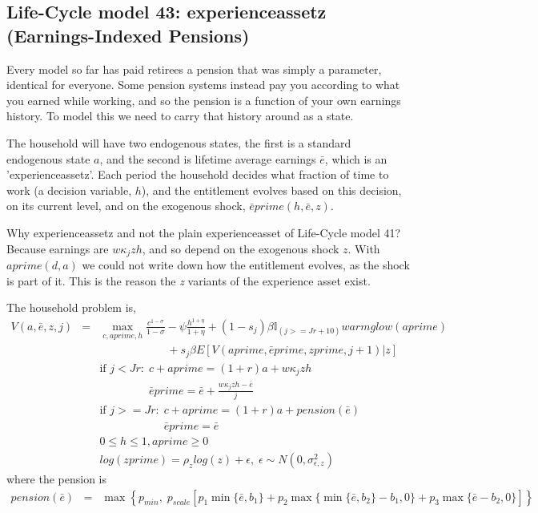 \subsection{Life-Cycle model 43: experienceassetz (Earnings-Indexed Pensions)}
Every model so far has paid retirees a pension that was simply a parameter, identical for everyone. Some pension systems instead pay you according to what you earned while working, and so the pension is a function of your own earnings history. To model this we need to carry that history around as a state.

The household will have two endogenous states, the first is a standard endogenous state $a$, and the second is lifetime average earnings $\bar{e}$, which is an 'experienceassetz'. Each period the household decides what fraction of time to work (a decision variable, $h$), and the entitlement evolves based on this decision, on its current level, and on the exogenous shock, $\bar{e}prime(h,\bar{e},z)$.

Why experienceassetz and not the plain experienceasset of Life-Cycle model 41? Because earnings are $w \kappa_j z h$, and so depend on the exogenous shock $z$. With $aprime(d,a)$ we could not write down how the entitlement evolves, as the shock is part of it. This is the reason the \textit{z} variants of the experience asset exist.

The household problem is,
\begin{eqnarray*}
 V(a,\bar{e},z,j) &=& \max_{c,aprime,h} \frac{c^{1-\sigma}}{1-\sigma} - \psi \frac{h^{1+\eta}}{1+\eta} + (1-s_j)\beta  \mathbb{I}_{(j>=Jr+10)} warmglow(aprime)    \\
 && \quad \quad \quad \quad \quad \quad  + s_j \beta E[V(aprime,\bar{e}prime,zprime,j+1)|z] \\
&& \text{if }j<Jr: \; c+aprime=(1+r)a+ w \kappa_j z h \\
&& \phantom{\text{if }j<Jr:} \; \bar{e}prime=\bar{e}+\frac{w \kappa_j z h - \bar{e}}{j} \\
&& \text{if }j>=Jr: \; c+aprime=(1+r)a + pension(\bar{e}) \\
&& \phantom{\text{if }j>=Jr:} \; \bar{e}prime=\bar{e} \\
&& 0 \leq h \leq 1, aprime\geq 0 \\
&& log(zprime)=\rho_z log(z) + \epsilon, \; \epsilon \sim N(0,\sigma_{\epsilon,z}^2)
\end{eqnarray*}
where the pension is
\begin{eqnarray*}
pension(\bar{e}) &=& \max \left\{ p_{min}, \; p_{scale} \left[ p_1 \min\{\bar{e},b_1\} + p_2 \max\{\min\{\bar{e},b_2\}-b_1,0\} + p_3 \max\{\bar{e}-b_2,0\} \right] \right\}
\end{eqnarray*}

